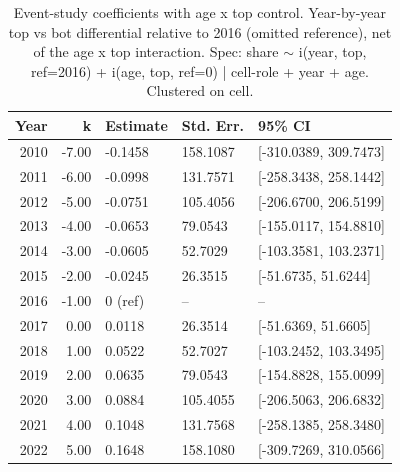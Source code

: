 \begin{table}[ht]
\centering
\caption{Event-study coefficients with age x top control. Year-by-year top vs bot differential relative to 2016 (omitted reference), net of the age x top interaction. Spec: share $\sim$ i(year, top, ref=2016) + i(age, top, ref=0) | cell-role + year + age. Clustered on cell.} 
\label{tab:phase4_within_intensive_did_agecontrol_eventstudy}
\begin{tabular}{rrlll}
  \toprule
Year & k & Estimate & Std. Err. & 95\% CI \\ 
  \midrule
2010 & -7.00 & -0.1458 & 158.1087 & [-310.0389, 309.7473] \\ 
  2011 & -6.00 & -0.0998 & 131.7571 & [-258.3438, 258.1442] \\ 
  2012 & -5.00 & -0.0751 & 105.4056 & [-206.6700, 206.5199] \\ 
  2013 & -4.00 & -0.0653 & 79.0543 & [-155.0117, 154.8810] \\ 
  2014 & -3.00 & -0.0605 & 52.7029 & [-103.3581, 103.2371] \\ 
  2015 & -2.00 & -0.0245 & 26.3515 & [-51.6735, 51.6244] \\ 
  2016 & -1.00 & 0 (ref) & -- & -- \\ 
  2017 & 0.00 & 0.0118 & 26.3514 & [-51.6369, 51.6605] \\ 
  2018 & 1.00 & 0.0522 & 52.7027 & [-103.2452, 103.3495] \\ 
  2019 & 2.00 & 0.0635 & 79.0543 & [-154.8828, 155.0099] \\ 
  2020 & 3.00 & 0.0884 & 105.4055 & [-206.5063, 206.6832] \\ 
  2021 & 4.00 & 0.1048 & 131.7568 & [-258.1385, 258.3480] \\ 
  2022 & 5.00 & 0.1648 & 158.1080 & [-309.7269, 310.0566] \\ 
   \bottomrule
\end{tabular}
\end{table}
